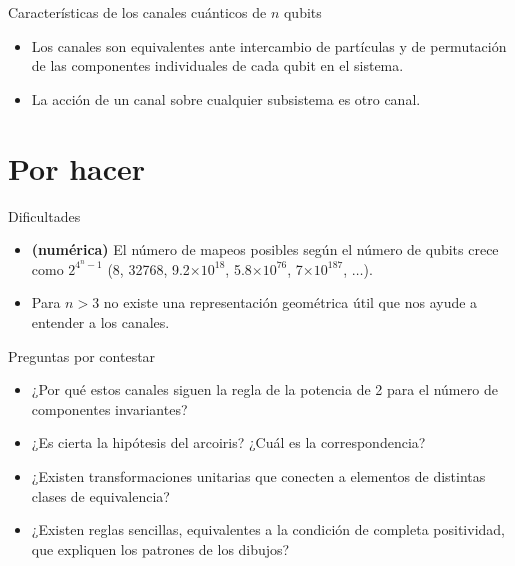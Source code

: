 \documentclass[11pt,xcolor=dvipsnames]{beamer}
\begin{document}
\begin{frame}[noframenumbering]{Características de los canales cuánticos de $n$ 
qubits}
	\begin{itemize}[label=$\textcolor{Blue}{\blacktriangleright}$]
	\item<1-> Los canales son equivalentes ante intercambio de partículas y de
				permutación de las componentes individuales de cada qubit en el 
				sistema. 
	\item<2-> La acción de un canal sobre cualquier subsistema es otro canal.
	\end{itemize}

\end{frame}
	


\section{Por hacer}

\begin{frame}{Dificultades}\pause

	\begin{itemize}[label=$\textcolor{Blue}{\blacktriangleright}$]
		\item \textbf{(numérica)}
		El número de mapeos posibles según el número de qubits crece como 
		$2^{4^n-1}$ (8, 32768, 9.2$\times 10^{18}$, 5.8$\times 10^{76}$, 
		7$\times 10^{187}$, $\ldots$).
		\pause
		
		\item Para $n>3$ no existe una representación geométrica útil que nos
		ayude a entender a los canales.
		
	\end{itemize}
\end{frame}

\begin{frame}{Preguntas por contestar}
	\begin{itemize}[label=$\textcolor{Blue}{\blacktriangleright}$]
		\item<2-> ¿Por qué estos canales siguen la regla de la potencia de 2 para el 
					número de componentes invariantes?
		\item<3-> ¿Es cierta la hipótesis del arcoiris? ¿Cuál es la correspondencia?
		\item<4-> ¿Existen transformaciones unitarias que conecten a elementos de
					distintas clases de equivalencia?
		\item<5-> ¿Existen reglas sencillas, equivalentes a la condición de completa
					positividad, que expliquen los patrones de los dibujos?
	\end{itemize}\vfill 
\end{frame}
\end{document}
